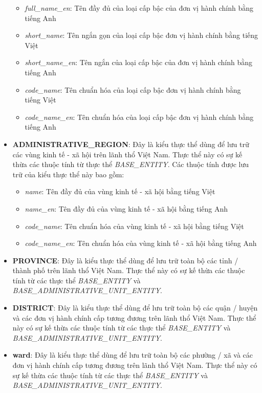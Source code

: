 \begin{itemize}
\begin{itemize}
        \item \textit{full\_name\_en}: Tên đầy đủ của loại cấp bậc của đơn vị hành chính bằng tiếng Anh
        \item \textit{short\_name}: Tên ngắn gọn của loại cấp bậc đơn vị hành chính bằng tiếng Việt
        \item \textit{short\_name\_en}: Tên ngắn của loại cấp bậc của đơn vị hành chính bằng tiếng Anh
        \item \textit{code\_name}: Tên chuẩn hóa của loại cấp bậc đơn vị hành chính bằng tiếng Việt
        \item \textit{code\_name\_en}: Tên chuẩn hóa của loại cấp bậc đơn vị hành chính bằng tiếng Anh
    \end{itemize}
    \item \textbf{ADMINISTRATIVE\_REGION}: Đây là kiểu thực thể dùng để lưu trữ các vùng kinh tế - xã hội trên lãnh thổ Việt Nam. Thực thể này có sự kế thừa các thuộc tính từ thực thể \textit{BASE\_ENTITY}. Các thuộc tính được lưu trữ của kiểu thực thể này bao gồm:
    \begin{itemize}
        \item \textit{name}: Tên đầy đủ của vùng kinh tế - xã hội bằng tiếng Việt
        \item \textit{name\_en}: Tên đầy đủ của vùng kinh tế - xã hội bằng tiếng Anh
        \item \textit{code\_name}: Tên chuẩn hóa của vùng kinh tế - xã hội bằng tiếng Việt
        \item \textit{code\_name\_en}: Tên chuẩn hóa của vùng kinh tế - xã hội bằng tiếng Anh
    \end{itemize}
    \item \textbf{PROVINCE}: Đây là kiểu thực thể dùng để lưu trữ toàn bộ các tỉnh / thành phố trên lãnh thổ Việt Nam. Thực thể này có sự kế thừa các thuộc tính từ các thực thể \textit{BASE\_ENTITY} và \textit{BASE\_ADMINISTRATIVE\_UNIT\_ENTITY}.
    \item \textbf{DISTRICT}: Đây là kiểu thực thể dùng để lưu trữ toàn bộ các quận / huyện và các đơn vị hành chính cấp tương đương trên lãnh thổ Việt Nam. Thực thể này có sự kế thừa các thuộc tính từ các thực thể \textit{BASE\_ENTITY} và \textit{BASE\_ADMINISTRATIVE\_UNIT\_ENTITY}.
    \item \textbf{ward}: Đây là kiểu thực thể dùng để lưu trữ toàn bộ các phường / xã và các đơn vị hành chính cấp tương đương trên lãnh thổ Việt Nam. Thực thể này có sự kế thừa các thuộc tính từ các thực thể \textit{BASE\_ENTITY} và \textit{BASE\_ADMINISTRATIVE\_UNIT\_ENTITY}.

\end{itemize}
